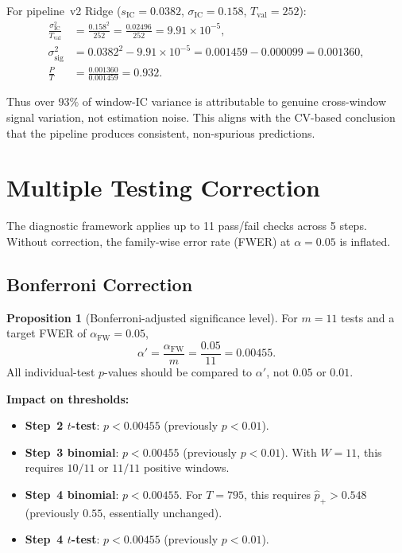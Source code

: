 \documentclass[11pt,a4paper]{article}
\theoremstyle{definition}
\newtheorem{proposition}{Proposition}[section]
\newcommand{\IC}{\operatorname{IC}}
\begin{document}
For pipeline~v2 Ridge ($s_{\IC}=0.0382$, $\sigma_{\IC}=0.158$,
$T_{\text{val}}=252$):
\begin{align}
    \frac{\sigma_{\IC}^{2}}{T_{\text{val}}}
        &= \frac{0.158^{2}}{252}
         = \frac{0.02496}{252}
         = 9.91 \times 10^{-5}, \\[4pt]
    \sigma_{\text{sig}}^{2} &= 0.0382^{2} - 9.91\times10^{-5}
                             = 0.001459 - 0.000099
                             = 0.001360, \\[4pt]
    \frac{P}{T} &= \frac{0.001360}{0.001459} = 0.932.
\end{align}

Thus over $93\%$ of window-IC variance is attributable to genuine
cross-window signal variation, not estimation noise. This aligns with
the CV-based conclusion that the pipeline produces consistent,
non-spurious predictions.

\section{Multiple Testing Correction}
\label{sec:multitest}

The diagnostic framework applies up to 11 pass/fail checks across
5 steps. Without correction, the family-wise error rate (FWER) at
$\alpha=0.05$ is inflated.

\subsection{Bonferroni Correction}

\begin{proposition}[Bonferroni-adjusted significance level]
For $m=11$ tests and a target FWER of $\alpha_{\text{FW}}=0.05$,
\begin{equation}
    \boxed{\alpha' = \frac{\alpha_{\text{FW}}}{m}
                   = \frac{0.05}{11}
                   = 0.00455}.
    \label{eq:bonferroni}
\end{equation}
All individual-test $p$-values should be compared to $\alpha'$, not
$0.05$ or $0.01$.
\end{proposition}

\textbf{Impact on thresholds:}
\begin{itemize}[nosep]
    \item \textbf{Step~2 $t$-test}: $p < 0.00455$ (previously $p < 0.01$).
    \item \textbf{Step~3 binomial}: $p < 0.00455$ (previously $p < 0.01$).
          With $W=11$, this requires $10/11$ or $11/11$ positive windows.
    \item \textbf{Step~4 binomial}: $p < 0.00455$. For $T=795$, this
          requires $\hat{p}_{+} > 0.548$ (previously $0.55$, essentially
          unchanged).
    \item \textbf{Step~4 $t$-test}: $p < 0.00455$ (previously $p < 0.01$).
\end{itemize}
\end{document}
